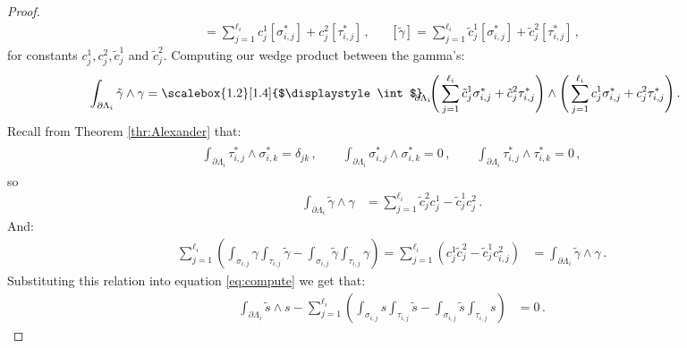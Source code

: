 \documentclass[11pt]{article}
\theoremstyle{plain}
\theoremstyle{definition}
\theoremstyle{remark}
\newcommand{\ST}{\Lambda}
\begin{document}
\begin{proof}
\begin{align*}
    [\gamma] = \sum_{j=1}^{\ell_i} c_{j}^1  [\sigma_{i,j}^*]+ c_{j}^2 [\tau_{i,j}^*] \, , & &
    [\tilde{\gamma}] = \sum_{j=1}^{\ell_i} \tilde{c}_{j}^1 [\sigma_{i,j}^*]+ \tilde{c}_{j}^2 [\tau_{i,j}^*] \, ,
\end{align*}
for constants \( c_{j}^1,  c_{j}^2, \tilde{c}_{j}^1\) and \(\tilde{c}_{j}^2\). Computing our wedge product between the gamma's:
\begin{align*}
    \int_{\partial \ST_i} \tilde{\gamma} \wedge \gamma  & = \scalebox{1.2}[1.4]{$\displaystyle\int$}_{ \! \! \! \! \! \partial \ST_i} \!  \Bigg(  \sum_{j=1}^{\ell_i} \tilde{c}_{j}^1 \sigma_{i,j}^*+ \tilde{c}_{j}^2 \tau_{i,j}^* \Bigg) \wedge \Bigg(   \sum_{j=1}^{\ell_i} c_{j}^1  \sigma_{i,j}^*+ c_{j}^2 \tau_{i,j}^*   \Bigg) \, .
\end{align*}
Recall from Theorem \ref{thr:Alexander} that: 
\begin{align*}
    \begin{gathered}
         \int_{\partial \ST_i} \tau_{i,j}^* \wedge \sigma_{i,k}^* = \delta_{jk}  \,, \qquad
        \int_{\partial \ST_i} \sigma_{i,j}^* \wedge \sigma_{i,k}^* = 
         0 \,,    \qquad 
         \int_{\partial \ST_i} \tau_{i,j}^* \wedge \tau_{i,k}^*
        = 0 \, ,
    \end{gathered}
\end{align*}   
so
\begin{align*}
\int_{\partial \ST_i} \tilde{\gamma} \wedge \gamma & 
  =  \sum_{j=1}^{\ell_i} 
  \tilde{c}_{j}^2  c_{j}^1  - \tilde{c}_{j}^1  c_{j}^2 
  \, . 
\end{align*}
And:
\begin{align*}
     \sum_{j=1}^{\ell_i}  \left( \int_{\sigma_{i,j}}  \!  \gamma \int_{\tau_{i,j}}  \!  \tilde{\gamma} - \int_{\sigma_{i,j}}  \!  \tilde{\gamma}    \int_{\tau_{i,j}}  \!  \gamma \right) 
     = \sum_{j=1}^{\ell_i}  \left( c^1_{j}  \tilde{c}^2_{j} - \tilde{c}^1_{j}  c^2_{i,j}  \right) 
     & = \int_{\partial \ST_i} \tilde{\gamma} \wedge \gamma \, . 
\end{align*}
Substituting this relation into equation \eqref{eq:compute} we get that:
\begin{align*}
    \int_{\partial \ST_i} \tilde{s} \wedge s - \sum_{j=1}^{\ell_i}  \left( \int_{\sigma_{i,j}}  \!  s \int_{\tau_{i,j}}  \!  \tilde{s} - \int_{\sigma_{i,j}}  \!  \tilde{s}    \int_{\tau_{i,j}}  \!  s \right) 
    &=   0 \, .
\end{align*}
\end{proof}
\end{document}
